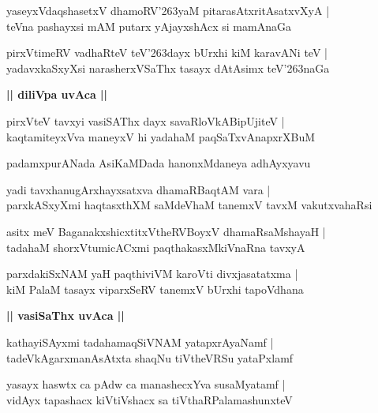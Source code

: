 \documentclass[twoside,12pt,openright]{book}
\def\S{\char'263}
\newcounter{shloka}[chapter]
\def\uvaca#1{\centerline{{\large\textbf{#1}}}}
\begin{document}
\begin{shloka}
yaseyxVdaqshasetxV dhamoRV\S yaM pitarasAtxritAsatxvXyA |\\
teVna pashayxsi mAM putarx yAjayxshAcx si mamAnaGa
\end{shloka}

\begin{shloka}
pirxVtimeRV vadhaRteV teV\S dayx bUrxhi kiM karavANi teV |\\
yadavxkaSxyXsi narasherxVSaThx tasayx dAtAsimx teV\S naGa
\end{shloka}

\uvaca{|| diliVpa uvAca ||}

\begin{shloka}
pirxVteV  tavxyi vasiSAThx dayx savaRloVkABipUjiteV |\\
kaqtamiteyxVva maneyxV hi yadahaM paqSaTxvAnapxrXBuM
\end{shloka}

\begin{center}
padamxpurANada AsiKaMDada hanonxMdaneya adhAyxyavu
\end{center}

\begin{shloka}
yadi tavxhanugArxhayxsatxva dhamaRBaqtAM vara |\\
parxkASxyXmi haqtasxthXM saMdeVhaM tanemxV tavxM vakutxvahaRsi
\end{shloka}

\begin{shloka}
asitx meV BaganakxshicxtitxVtheRVBoyxV dhamaRsaMshayaH |\\
tadahaM shorxVtumicACxmi paqthakasxMkiVnaRna tavxyA 
\end{shloka}

\begin{shloka}
parxdakiSxNAM yaH paqthiviVM karoVti divxjasatatxma |\\
kiM PalaM tasayx viparxSeRV tanemxV bUrxhi tapoVdhana
\end{shloka}

\uvaca{|| vasiSaThx uvAca ||}

\begin{shloka}
kathayiSAyxmi tadahamaqSiVNAM yatapxrAyaNamf |\\
tadeVkAgarxmanAsAtxta shaqNu tiVtheVRSu yataPxlamf
\end{shloka}

\begin{shloka}
yasayx haswtx ca pAdw ca manashecxYva susaMyatamf |\\
vidAyx tapashacx kiVtiVshacx sa tiVthaRPalamashunxteV
\end{shloka}
\end{document}
